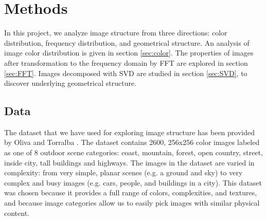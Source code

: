 \documentclass{report}
\begin{document}


\chapter{Methods}
In this project, we analyze image structure from three directions: color distribution, frequency distribution, and geometrical structure. An analysis of image color distribution is given in section \ref{sec:color}. The properties of images after transformation to the frequency domain by FFT are explored in section \ref{sec:FFT}. Images decomposed with SVD are studied in section \ref{sec:SVD}, to discover underlying geometrical structure.
 

\section{Data}
The dataset that we have used for exploring image structure has been provided by Oliva and Torralba \cite{gist_descriptor}. The dataset contains 2600, 256x256 color images labeled as one of 8 outdoor scene categories: coast, mountain, forest, open country, street, inside city, tall buildings and highways. The images in the dataset are varied in complexity: from very simple, planar scenes (e.g. a ground and sky) to very complex and busy images (e.g. cars, people, and buildings in a city). This dataset was chosen because it provides a full range of colors, complexities, and textures, and because image categories allow us to easily pick images with similar physical content.
\end{document}
